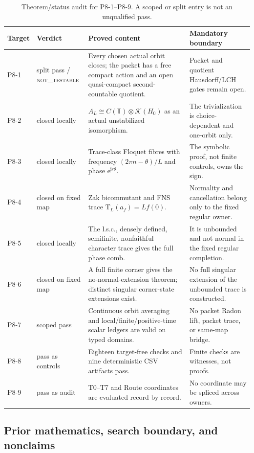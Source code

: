 \documentclass[11pt]{article}
\theoremstyle{definition}
\newcommand{\T}{\mathbb{T}}
\newcommand{\K}{\mathcal{K}}
\newcommand{\e}{\mathrm{e}}
\newcommand{\ii}{\mathrm{i}}
\newcommand{\Tau}{\mathrm{T}}
\newcommand{\NOTTESTABLE}{\textsc{not\_testable}}
\begin{document}
\begin{table}[htbp]
\centering\small
\caption{Theorem/status audit for P8-1--P8-9.  A scoped or split entry is not an unqualified pass.}\label{tab:p8}
\begin{tabularx}{\textwidth}{P{0.08\textwidth}P{0.19\textwidth}Y Y}
\toprule
Target & Verdict & Proved content & Mandatory boundary\\
\midrule
P8-1 & split pass / \NOTTESTABLE & Every chosen actual orbit closes; the packet has a free compact action and an open quasi-compact second-countable quotient. & Packet and quotient Hausdorff/LCH gates remain open.\\
P8-2 & closed locally & \(A_L\cong C(\T)\otimes\K(H_0)\) as an actual unstabilized isomorphism. & The trivialization is choice-dependent and one-orbit only.\\
P8-3 & closed locally & Trace-class Floquet fibres with frequency \((2\pi n-\theta)/L\) and phase \(\e^{\ii r\theta}\). & The symbolic proof, not finite controls, owns the sign.\\
P8-4 & closed on fixed map & Zak bicommutant and FNS trace \(\Tau_L(a_f)=Lf(0)\). & Normality and cancellation belong only to the fixed regular owner.\\
P8-5 & closed locally & The l.s.c., densely defined, semifinite, nonfaithful character trace gives the full phase comb. & It is unbounded and not normal in the fixed regular completion.\\
P8-6 & closed on fixed map & A full finite corner gives the no-normal-extension theorem; distinct singular corner-state extensions exist. & No full singular extension of the unbounded trace is constructed.\\
P8-7 & scoped pass & Continuous orbit averaging and local/finite/positive-time scalar ledgers are valid on typed domains. & No packet Radon lift, packet trace, or same-map bridge.\\
P8-8 & pass as controls & Eighteen target-free checks and nine deterministic CSV artifacts pass. & Finite checks are witnesses, not proofs.\\
P8-9 & pass as audit & T0--T7 and Route coordinates are evaluated record by record. & No coordinate may be spliced across owners.\\
\bottomrule
\end{tabularx}
\end{table}

\subsection{Prior mathematics, search boundary, and nonclaims}
\end{document}
